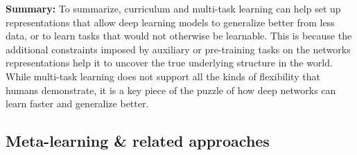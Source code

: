 \textbf{Summary:} To summarize, curriculum and multi-task learning can help set up representations that allow deep learning models to generalize better from less data, or to learn tasks that would not otherwise be learnable. This is because the additional constraints imposed by auxiliary or pre-training tasks on the networks representations help it to uncover the true underlying structure in the world. While multi-task learning does not support all the kinds of flexibility that humans demonstrate, it is a key piece of the puzzle of how deep networks can learn faster and generalize better. \par

\subsection{Meta-learning \& related approaches} \label{meta_learning_sec}

